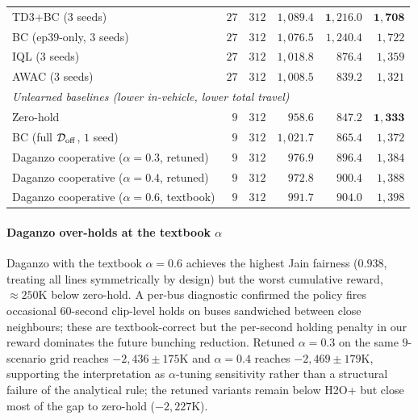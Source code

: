 \begin{table}[t]
{\begin{tabular}{lrrrrr}
TD3+BC (3 seeds)                                     & $27$ & $312$ & $1{,}089.4$ & $\mathbf{1{,}216.0}$ & $\mathbf{1{,}708}$ \\
BC (ep39-only, $3$ seeds)                            & $27$ & $312$ & $1{,}076.5$ & $1{,}240.4$ & $1{,}722$ \\
IQL (3 seeds)                                        & $27$ & $312$ & $1{,}018.8$ & $876.4$ & $1{,}359$ \\
AWAC (3 seeds)                                       & $27$ & $312$ & $1{,}008.5$ & $839.2$ & $1{,}321$ \\
\midrule
\multicolumn{6}{l}{\emph{Unlearned baselines (lower in-vehicle, lower total travel)}} \\
Zero-hold                                            & $9$  & $312$ & $958.6$ & $\mathbf{847.2}$ & $\mathbf{1{,}333}$ \\
BC (full $\mathcal{D}_{\mathrm{off}}$, $1$ seed)                           & $9$  & $312$ & $1{,}021.7$ & $865.4$ & $1{,}372$ \\
Daganzo cooperative ($\alpha = 0.3$, retuned)        & $9$  & $312$ & $976.9$ & $896.4$ & $1{,}384$ \\
Daganzo cooperative ($\alpha = 0.4$, retuned)        & $9$  & $312$ & $972.8$ & $900.4$ & $1{,}388$ \\
Daganzo cooperative ($\alpha = 0.6$, textbook)       & $9$  & $312$ & $991.7$ & $904.0$ & $1{,}398$ \\
\bottomrule
\end{tabular}%
}
\end{table}

\paragraph{Daganzo over-holds at the textbook $\alpha$}
Daganzo with the textbook $\alpha = 0.6$ achieves the highest Jain fairness ($0.938$, treating all lines symmetrically by design) but the worst cumulative reward, $\approx 250$K below zero-hold.
A per-bus diagnostic confirmed the policy fires occasional $60$-second clip-level holds on buses sandwiched between close neighbours; these are textbook-correct but the per-second holding penalty in our reward dominates the future bunching reduction.
Retuned $\alpha = 0.3$ on the same $9$-scenario grid reaches $-2{,}436 \pm 175$K and $\alpha = 0.4$ reaches $-2{,}469 \pm 179$K, supporting the interpretation as $\alpha$-tuning sensitivity rather than a structural failure of the analytical rule; the retuned variants remain below H2O+ but close most of the gap to zero-hold ($-2{,}227$K).

